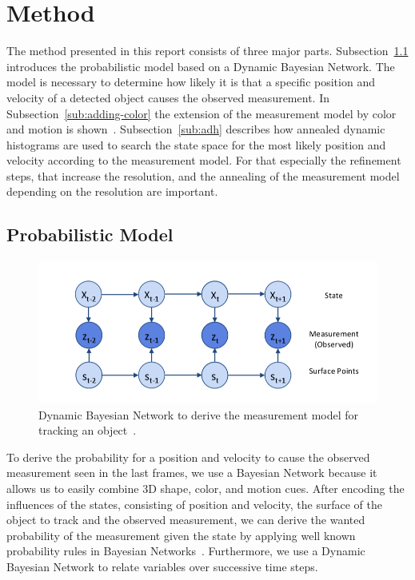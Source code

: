 \documentclass[twoside,a4paper,article]{combine}
\begin{document}
\section{Method}
\label{sec:method}
The method presented in this report consists of three major
parts. Subsection~\ref{sub:probabilistic-model} introduces the
probabilistic model based on a Dynamic Bayesian Network. The model is
necessary to determine how likely it is that a specific position and
velocity of a detected object causes the observed
measurement. In Subsection~\ref{sub:adding-color} the extension of the
measurement model by color and motion is shown~\cite{paper}.
Subsection~\ref{sub:adh} describes how annealed dynamic
histograms are used to search the state space for the most likely
position and velocity according to the measurement model. For that
especially the refinement steps, that increase the resolution, and the
annealing of the measurement model depending on the resolution are
important.

\subsection{Probabilistic Model}
\label{sub:probabilistic-model}

\begin{figure}
  \center
  \includegraphics[width=.8\linewidth]{dbn}
  \caption{Dynamic Bayesian Network to derive the measurement model
    for tracking an object~\cite{paper}.}
  \label{fig:dbn}
\end{figure}

To derive the probability for a position and velocity to cause the
observed measurement seen in the last frames, we use a Bayesian
Network because it allows us to easily combine 3D shape, color, and
motion cues. After encoding the influences of the states,
consisting of position and velocity, the surface of the object to
track and the observed measurement, we can derive the wanted
probability of the measurement given the state by applying well known
probability rules in Bayesian Networks~\cite{ai-modern}. Furthermore,
we use a Dynamic Bayesian Network to relate variables over successive
time steps.
\end{document}
